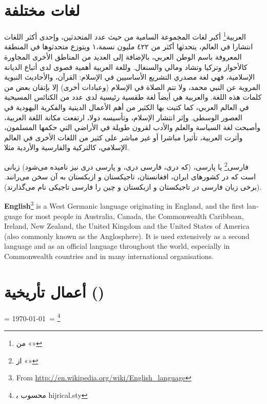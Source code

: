 \documentclass[a4paper]{article}
\begin{document}
\section{\arabicfont لغات مختلفة}


{\Large العربية}\footnote{%
	من «»} 
أكبر لغات المجموعة السامية من حيث عدد المتحدثين، وإحدى أكثر اللغات انتشارا في
العالم، يتحدثها أكثر من ٤٢٢ مليون نسمة،١ ويتوزع متحدثوها في المنطقة المعروفة
باسم الوطن العربي، بالإضافة إلى العديد من المناطق الأخرى المجاورة كالأحواز وتركيا
وتشاد ومالي والسنغال. وللغة العربية أهمية قصوى لدى أتباع الديانة الإسلامية، فهي
لغة مصدري التشريع الأساسيين في الإسلام: القرآن، والأحاديث النبوية المروية عن النبي
محمد، ولا تتم الصلاة في الإسلام (وعبادات أخرى) إلا بإتقان بعض من كلمات هذه اللغة.
والعربية هي أيضاً لغة طقسية رئيسية لدى عدد من الكنائس المسيحية في العالم العربي،
كما كتبت بها الكثير من أهم الأعمال الدينية والفكرية اليهودية في العصور الوسطى.
وإثر انتشار الإسلام، وتأسيسه دولا، ارتفعت مكانة اللغة العربية، وأصبحت لغة السياسة
والعلم والأدب لقرون طويلة في الأراضي التي حكمها المسلمون، وأثرت العربية، تأثيرا
مباشرا أو غير مباشر على كثير من اللغات الأخرى في العالم الإسلامي، كالتركية
والفارسية والأردية مثلا.

\begin{farsi}
{\Large فارسی}\footnote{%
	از «»}
یا پارسی، (که دری، فارسی دری، و پارسی دری نیز نامیده می‌شود) زبانی است که
در کشورهای ایران، افغانستان، تاجیکستان و ازبکستان به آن سخن می‌رانند.
(برخی زبان فارسی در تاجیکستان و ازبکستان و چین را فارسی تاجیکی نام
می‌گذارند).  
\end{farsi}

\bigskip

\begin{english}
\textbf{English}\footnote{%
	From \url{http://en.wikipedia.org/wiki/English_language}} 
is a West Germanic language originating in England, and the first language for
most people in Australia, Canada, the Commonwealth Caribbean, Ireland, New
Zealand, the United Kingdom and the United States of America (also commonly
known as the Anglosphere). It is used extensively as a second language and as
an official language throughout the world, especially in Commonwealth countries
and in many international organisations.

\end{english}
\bigskip

\section{\arabicfont أعمال تأريخية ()}


\LR{\localenglish{\rmfamily\today}} = \today\ = \Hijritoday\footnote{ 
	محسوب ب‍ \textsf{hijrical.sty}} 
\end{document}
